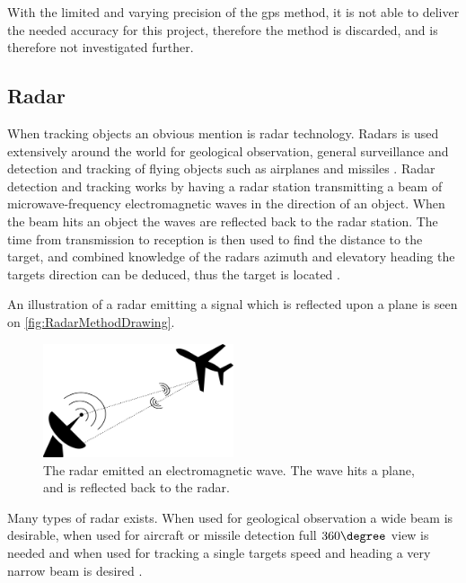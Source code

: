 With the limited and varying precision of the \gls{gps} method, it is not able to deliver the needed accuracy for this project, therefore the method is discarded, and is therefore not investigated further.  

\subsection{Radar}
When tracking objects an obvious mention is radar technology. Radars is used extensively around the world for geological observation, general surveillance and detection and tracking of flying objects such as airplanes and missiles \citep{radar_handbook}. 
Radar detection and tracking works by having a radar station transmitting a beam of microwave-frequency electromagnetic waves in the direction of an object. When the beam hits an object the waves are reflected back to the radar station. The time from transmission to reception is then used to find the distance to the target, and combined knowledge of the radars azimuth and elevatory heading the targets direction can be deduced, thus the target is located \citep{TechReport:RadarSystem}.

An illustration of a radar emitting a signal which is reflected upon a plane is seen on \autoref{fig:RadarMethodDrawing}. 
\begin{figure}[h!]
    \centering
        \includegraphics[width=0.5\textwidth]{figures/tracking/RadarMethodDrawing.pdf}
        \caption{The radar emitted an electromagnetic wave. The wave hits a plane, and is reflected back to the radar.}
        \label{fig:RadarMethodDrawing}
\end{figure}

\newpage
Many types of radar exists. When used for geological observation a wide beam is desirable, when used for aircraft or missile detection full $360\degree$ view is needed and when used for tracking a single targets speed and heading a very narrow beam is desired \citep{radar_handbook}.

